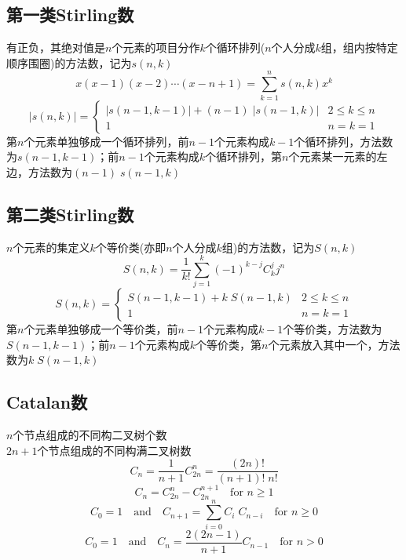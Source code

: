 \subsection{第一类Stirling数}
有正负，其绝对值是$n$个元素的项目分作$k$个循环排列($n$个人分成$k$组，组内按特定顺序围圈)的方法数，记为$s(n,k)$
\begin{displaymath}
x(x-1)(x-2)\cdots(x-n+1) = \sum_{k=1}^{n} s(n, k) x^{k}
\end{displaymath}
\begin{displaymath}
|s(n, k)| = 
\begin{cases}
|s(n-1, k-1)| + (n-1)\;|s(n-1, k)| & 2 \leqslant k \leqslant n\\
1 & n=k=1
\end{cases}
\end{displaymath}
第$n$个元素单独够成一个循环排列，前$n-1$个元素构成$k-1$个循环排列，方法数为$s(n-1, k-1)$；前$n-1$个元素构成$k$个循环排列，第$n$个元素某一元素的左边，方法数为$(n-1)\;s(n-1, k)$\\

\subsection{第二类Stirling数}
$n$个元素的集定义$k$个等价类(亦即$n$个人分成$k$组)的方法数，记为$S(n,k)$
\begin{displaymath}
S(n, k) = \frac{1}{k!}\sum_{j=1}^{k} (-1)^{k-j} C_{k}^{j} j^{n}
\end{displaymath}
\begin{displaymath}
S(n, k) = 
\begin{cases}
S(n-1, k-1) + k\;S(n-1, k) & 2 \leqslant k \leqslant n\\
1 & n=k=1
\end{cases}
\end{displaymath}
第$n$个元素单独够成一个等价类，前$n-1$个元素构成$k-1$个等价类，方法数为$S(n-1, k-1)$；前$n-1$个元素构成$k$个等价类，第$n$个元素放入其中一个，方法数为$k\;S(n-1, k)$\\

\subsection{Catalan数}
$n$个节点组成的不同构二叉树个数\\
$2n+1$个节点组成的不同构满二叉树数
\begin{displaymath}
C_{n} = \frac{1}{n+1} C_{2n}^{n} = \frac{(2n)!}{(n+1)!\;n!}
\end{displaymath}
\begin{displaymath}
C_{n} = C_{2n}^{n} - C_{2n}^{n+1} \quad\mbox{for } n\geqslant 1
\end{displaymath}
\begin{displaymath}
C_{0} = 1 \quad\mbox{and}\quad C_{n+1} = \sum_{i=0}^{n} C_{i}\;C_{n-i} \quad\mbox{for } n\geqslant 0
\end{displaymath}
\begin{displaymath}
C_{0} = 1 \quad\mbox{and}\quad C_{n} = \frac{2(2n-1)}{n+1} C_{n-1} \quad\mbox{for } n>0
\end{displaymath}\\

